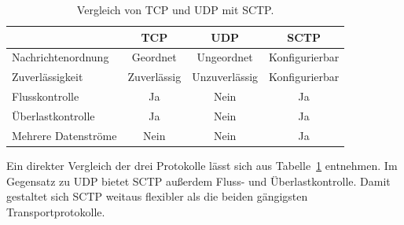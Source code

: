 \begin{table}[ht]
\centering
\begin{tabular}[t]{lccc}
\toprule
&TCP&UDP&SCTP\\
\midrule
Nachrichtenordnung&Geordnet&Ungeordnet&Konfigurierbar\\
Zuverlässigkeit&Zuverlässig&Unzuverlässig&Konfigurierbar\\
Flusskontrolle&Ja&Nein&Ja\\
Überlastkontrolle &Ja&Nein&Ja\\
Mehrere Datenströme&Nein&Nein&Ja\\
\bottomrule
\end{tabular}
\caption{Vergleich von \acs{TCP} und \acs{UDP} mit \acs{SCTP}.}
\label{table:vergleichNetzwerkProtokolle}
\end{table}

Ein direkter Vergleich der drei Protokolle lässt sich aus Tabelle~\ref{table:vergleichNetzwerkProtokolle} entnehmen. Im Gegensatz zu \acs{UDP} bietet \acs{SCTP} außerdem Fluss- und Überlastkontrolle. Damit gestaltet sich \acs{SCTP} weitaus flexibler als die beiden gängigsten Transportprotokolle.\par




